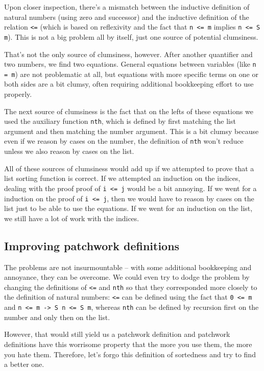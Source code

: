\documentclass[declaration,mgr,english,shortabstract]{iithesis}
\newcommand{\m}[1]{\texttt{#1}}
\begin{document}
Upon closer inspection, there's a mismatch between the inductive definition of natural numbers (using zero and successor) and the inductive definition of the relation \m{<=} (which is based on reflexivity and the fact that \m{n <= m} implies \m{n <= S m}). This is not a big problem all by itself, just one source of potential clumsiness.


That's not the only source of clumsiness, however. After another quantifier and two numbers, we find two equations. General equations between variables (like \m{n = m}) are not problematic at all, but equations with more specific terms on one or both sides are a bit clumsy, often requiring additional bookkeeping effort to use properly.

The next source of clumsiness is the fact that on the lefts of these equations we used the auxiliary function \m{nth}, which is defined by first matching the list argument and then matching the number argument. This is a bit clumsy because even if we reason by cases on the number, the definition of \m{nth} won't reduce unless we also reason by cases on the list.

All of these sources of clumsiness would add up if we attempted to prove that a list sorting function is correct. If we attempted an induction on the indices, dealing with the proof proof of \m{i <= j} would be a bit annoying. If we went for a induction on the proof of \m{i <= j}, then we would have to reason by cases on the list just to be able to use the equations. If we went for an induction on the list, we still have a lot of work with the indices.

\subsection{Improving patchwork definitions} \label{improvingpatchwork}

The problems are not insurmountable -- with some additional bookkeeping and annoyance, they can be overcome. We could even try to dodge the problem by changing the definitions of \m{<=} and \m{nth} so that they corresponded more closely to the definition of natural numbers: \m{<=} can be defined using the fact that \m{0 <= m} and \m{n <= m -> S n <= S m}, whereas \m{nth} can be defined by recursion first on the number and only then on the list.

However, that would still yield us a patchwork definition and patchwork definitions have this worrisome property that the more you use them, the more you hate them. Therefore, let's forgo this definition of sortedness and try to find a better one.
\end{document}
